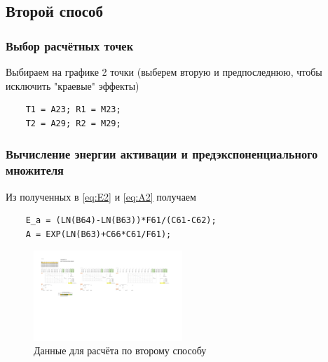 \documentclass[14pt,a4paper]{extarticle}
\begin{document}
\subsection{Второй способ}
\subsubsection{Выбор расчётных точек}
Выбираем на графике 2 точки (выберем вторую и предпоследнюю, чтобы исключить "краевые" эффекты)
\begin{lstlisting}
	T1 = A23; R1 = M23;
	T2 = A29; R2 = M29;
\end{lstlisting}
\subsubsection{Вычисление энергии активации и предэкспоненциального множителя}
Из полученных в \eqref{eq:E2} и \eqref{eq:A2} получаем
\begin{lstlisting}
	E_a = (LN(B64)-LN(B63))*F61/(C61-C62);
	A = EXP(LN(B63)+C66*C61/F61);
\end{lstlisting}
\begin{figure}[H]
	\centering
	\includegraphics[trim=50 355 880 222, clip, width=0.5\textwidth]{results.pdf}\caption{Данные для расчёта по второму способу}\label{fig:sposob2}
\end{figure}
\end{document}
